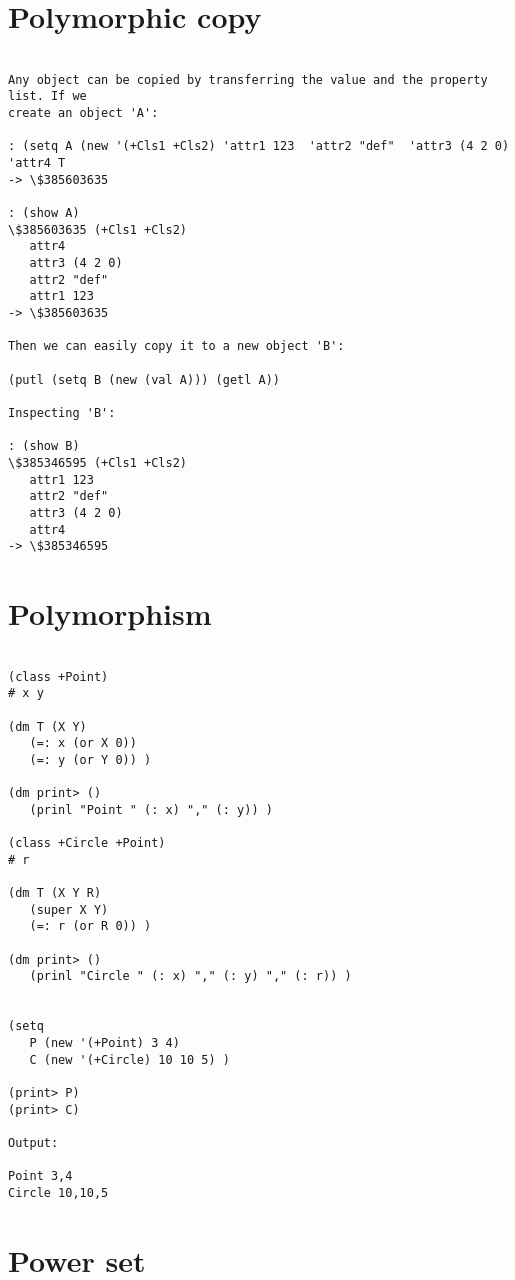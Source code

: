 \section*{Polymorphic copy}

\begin{verbatim}

Any object can be copied by transferring the value and the property list. If we
create an object 'A':

: (setq A (new '(+Cls1 +Cls2) 'attr1 123  'attr2 "def"  'attr3 (4 2 0)  'attr4 T
-> \$385603635

: (show A)
\$385603635 (+Cls1 +Cls2)
   attr4
   attr3 (4 2 0)
   attr2 "def"
   attr1 123
-> \$385603635

Then we can easily copy it to a new object 'B':

(putl (setq B (new (val A))) (getl A))

Inspecting 'B':

: (show B)
\$385346595 (+Cls1 +Cls2)
   attr1 123
   attr2 "def"
   attr3 (4 2 0)
   attr4
-> \$385346595

\end{verbatim}

\section*{Polymorphism}

\begin{verbatim}

(class +Point)
# x y

(dm T (X Y)
   (=: x (or X 0))
   (=: y (or Y 0)) )

(dm print> ()
   (prinl "Point " (: x) "," (: y)) )

(class +Circle +Point)
# r

(dm T (X Y R)
   (super X Y)
   (=: r (or R 0)) )

(dm print> ()
   (prinl "Circle " (: x) "," (: y) "," (: r)) )


(setq
   P (new '(+Point) 3 4)
   C (new '(+Circle) 10 10 5) )

(print> P)
(print> C)

Output:

Point 3,4
Circle 10,10,5

\end{verbatim}

\section*{Power set}

